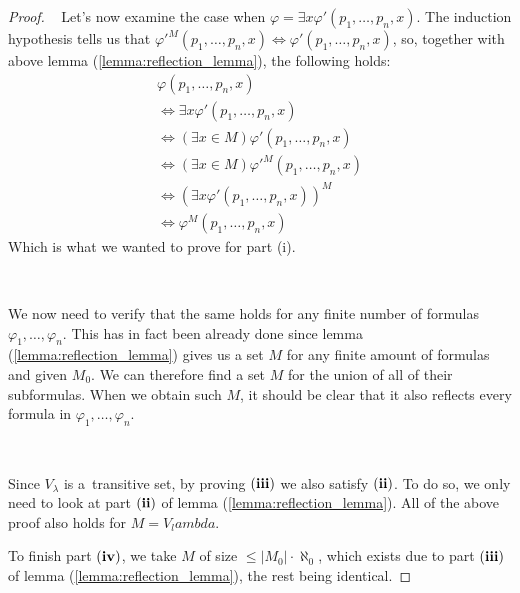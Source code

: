 \begin{proof}
\
Let's now examine the case when $\varphi = \exists x \varphi'(p_1, \ldots, p_n, x)$. The induction hypothesis tells us that $\varphi'^M(p_1, \ldots, p_n, x) \iff \varphi'(p_1, \ldots, p_n, x)$,
so, together with above lemma (\ref{lemma:reflection_lemma}), the following holds:
\begin{equation}
\begin{gathered}
\varphi(p_1, \ldots, p_n, x) \\
\iff \exists x \varphi'(p_1, \ldots, p_n, x) \\
\iff (\exists x \in M) \varphi'(p_1, \ldots, p_n, x) \\
\iff (\exists x \in M) \varphi'^M (p_1, \ldots, p_n, x) \\
\iff (\exists x \varphi'(p_1, \ldots, p_n, x))^M \\
\iff \varphi^M(p_1, \ldots, p_n, x)
\end{gathered}
\end{equation}
Which is what we wanted to prove for part (i). %

\

We now need to verify that the same holds for any finite number of formulas $\varphi_1, \ldots, \varphi_n$. 
This has in fact been already done since lemma (\ref{lemma:reflection_lemma}) gives us a set $M$ for any finite amount of formulas and given $M_0$. We can therefore find a set $M$ for the union of all of their subformulas. When we obtain such $M$, it should be clear that it also reflects every formula in $\varphi_1, \ldots, \varphi_n$.

\

Since $V_\lambda$ is a~transitive set, by proving $\bold{(iii)}$ we also satisfy $\bold{(ii)}$. To do so, we only need to look at part $\bold{(ii)}$ of lemma (\ref{lemma:reflection_lemma}). All of the above proof also holds for $M = V_lambda$. 

To finish part $\bold{(iv)}$, we take $M$ of size $\leq |M_0| \cdot \aleph_0$, which exists due to part $\bold{(iii)}$ of lemma (\ref{lemma:reflection_lemma}), the rest being identical.
\end{proof}



